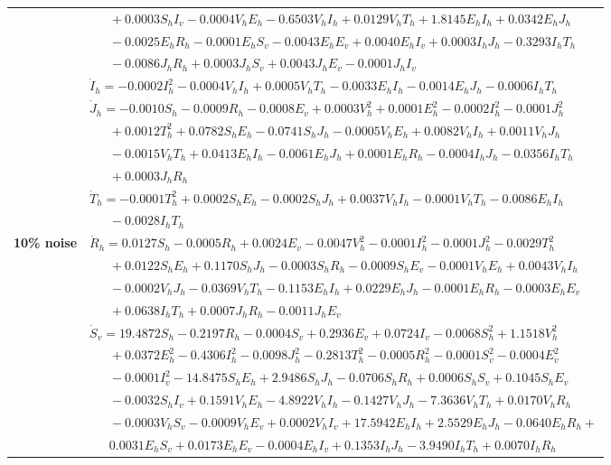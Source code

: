 \documentclass[9pt]{article}
\numberwithin{equation}{section}
\begin{document}
\begin{table}[ht]
\begin{tabularx}{1\linewidth}{|l|X|}
        & $\quad\;\;+0.0003S_hI_v-0.0004V_hE_h-0.6503V_hI_h+0.0129V_hT_h+1.8145E_hI_h+0.0342E_hJ_h$ \\
        & $\quad\;\;-0.0025E_hR_h-0.0001E_hS_v-0.0043E_hE_v+0.0040E_hI_v+0.0003I_hJ_h-0.3293I_hT_h$ \\
        & $\quad\;\;-0.0086J_hR_h+0.0003J_hS_v+0.0043J_hE_v-0.0001J_hI_v$ \\
        & $\dot{I}_h=-0.0002I_h^2-0.0004V_hI_h+0.0005V_hT_h-0.0033E_hI_h-0.0014E_hJ_h-0.0006I_hT_h$ \\
        & $\dot{J}_h=-0.0010S_h-0.0009R_h-0.0008E_v+0.0003V_h^2+0.0001E_h^2-0.0002I_h^2-0.0001J_h^2$ \\
        & $\quad\;\;+0.0012T_h^2+0.0782S_hE_h-0.0741S_hJ_h-0.0005V_hE_h+0.0082V_hI_h+0.0011V_hJ_h$ \\
        & $\quad\;\;-0.0015V_hT_h+0.0413E_hI_h-0.0061E_hJ_h+0.0001E_hR_h-0.0004I_hJ_h-0.0356I_hT_h$ \\
        & $\quad\;\;+0.0003J_hR_h$ \\
        & $\dot{T}_h=-0.0001T_h^2+0.0002S_hE_h-0.0002S_hJ_h+0.0037V_hI_h-0.0001V_hT_h-0.0086E_hI_h$ \\
        & $\quad\;\;-0.0028I_hT_h$ \\
        \textbf{10\% noise} & $\dot{R}_h=0.0127S_h-0.0005R_h+0.0024E_v-0.0047V_h^2-0.0001I_h^2-0.0001J_h^2-0.0029T_h^2$ \\
        & $\quad\;\;+0.0122S_hE_h+0.1170S_hJ_h-0.0003S_hR_h-0.0009S_hE_v-0.0001V_hE_h+0.0043V_hI_h$ \\
        & $\quad\;\;-0.0002V_hJ_h-0.0369V_hT_h-0.1153E_hI_h+0.0229E_hJ_h-0.0001E_hR_h-0.0003E_hE_v$ \\
        & $\quad\;\;+0.0638I_hT_h+0.0007J_hR_h-0.0011J_hE_v$ \\
        & $\dot{S}_v=19.4872S_h-0.2197R_h-0.0004S_v+0.2936E_v+0.0724I_v-0.0068S_h^2+1.1518V_h^2$ \\
        & $\quad\;\;+0.0372E_h^2-0.4306I_h^2-0.0098J_h^2-0.2813T_h^2-0.0005R_h^2-0.0001S_v^2-0.0004E_v^2$ \\
        & $\quad\;\;-0.0001I_v^2-14.8475S_hE_h+2.9486S_hJ_h-0.0706S_hR_h+0.0006S_hS_v+0.1045S_hE_v$ \\
        & $\quad\;\;-0.0032S_hI_v+0.1591V_hE_h-4.8922V_hI_h-0.1427V_hJ_h-7.3636V_hT_h+0.0170V_hR_h$ \\
        & $\quad\;\;-0.0003V_hS_v-0.0009V_hE_v+0.0002V_hI_v+17.5942E_hI_h+2.5529E_hJ_h-0.0640E_hR_h+$ \\
        & $\quad\;\;0.0031E_hS_v+0.0173E_hE_v-0.0004E_hI_v+0.1353I_hJ_h-3.9490I_hT_h+0.0070I_hR_h$ \\

\end{tabularx}
\end{table}
\end{document}
